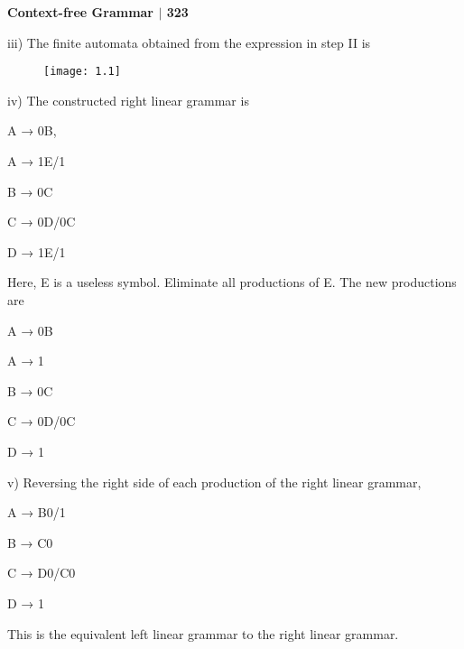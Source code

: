 \documentclass[10pt,a4paper]{book}
\begin{document}
\small

\begin{flushright}
\textsf{\textbf{Context-free Grammar $|$ 323}}
\end{flushright}

\begin{flushleft}
  iii) The finite automata obtained from the expression in step II is
\end{flushleft}

\begin{figure}[h]
  \centering
  \texttt{[image: 1.1]}\\
\end{figure}

\begin{flushleft}
  iv) The constructed right linear grammar is
  
  \qquad
  
  \qquad\qquad\qquad\qquad\qquad\qquad\qquad\qquad\qquad A → 0B,
  
  \qquad\qquad\qquad\qquad\qquad\qquad\qquad\qquad\qquad A → 1E/1
  
  \qquad\qquad\qquad\qquad\qquad\qquad\qquad\qquad\qquad B → 0C
  
  \qquad\qquad\qquad\qquad\qquad\qquad\qquad\qquad\qquad C → 0D/0C
  
  \qquad\qquad\qquad\qquad\qquad\qquad\qquad\qquad\qquad D → 1E/1
  
  \qquad
  
   Here, E is a useless symbol. Eliminate all productions of E. The new productions are
   
   \quad
   
\qquad\qquad\qquad\qquad\qquad\qquad\qquad\qquad\qquad A → 0B

\qquad\qquad\qquad\qquad\qquad\qquad\qquad\qquad\qquad A → 1

\qquad\qquad\qquad\qquad\qquad\qquad\qquad\qquad\qquad B → 0C

\qquad\qquad\qquad\qquad\qquad\qquad\qquad\qquad\qquad C → 0D/0C

\qquad\qquad\qquad\qquad\qquad\qquad\qquad\qquad\qquad D → 1

\qquad

v) Reversing the right side of each production of the right linear grammar,

\qquad

\qquad\qquad\qquad\qquad\qquad\qquad\qquad\qquad\qquad A → B0/1

\qquad\qquad\qquad\qquad\qquad\qquad\qquad\qquad\qquad B → C0

\qquad\qquad\qquad\qquad\qquad\qquad\qquad\qquad\qquad C → D0/C0

\qquad\qquad\qquad\qquad\qquad\qquad\qquad\qquad\qquad D → 1

\qquad

This is the equivalent left linear grammar to the right linear grammar.
\end{flushleft}
\end{document}
